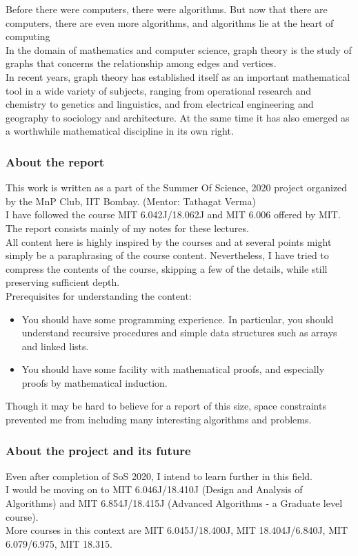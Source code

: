 Before there were computers, there were algorithms. But now that there are computers, there are even more algorithms, and algorithms lie at the heart of computing\\
In the domain of mathematics and computer science, graph theory is the study of graphs that concerns the relationship among edges and vertices.\\
In recent years, graph theory has established itself as an important mathematical tool in a wide variety of subjects, ranging from operational research and chemistry to genetics and linguistics, and from electrical engineering and geography to sociology and architecture. At the same time it has also emerged as a worthwhile mathematical discipline in its own right.

\subsubsection*{About the report}
This work is written as a part of the Summer Of Science, 2020 project organized by the MnP Club, IIT Bombay. (Mentor: Tathagat Verma)\\
I have followed the course MIT 6.042J/18.062J and MIT 6.006 offered by MIT. The report consists mainly of my notes for these lectures.\\
All content here is highly inspired by the courses and at several points might simply be a paraphrasing of the course content. Nevertheless, I have tried to compress the contents of the course, skipping a few of the details, while still preserving sufficient depth.\\
\vspace{3mm}
Prerequisites for understanding the content:\\
\vspace{-3mm}
\begin{itemize}[itemsep = -1 mm]
  \item You should have some programming experience. In particular, you should understand recursive procedures and simple data structures such as arrays and linked lists.
  \item You should have some facility with mathematical proofs, and especially proofs by mathematical induction.
\end{itemize}
Though it may be hard to believe for a report of this size, space constraints prevented me from including many interesting algorithms and problems.

\subsubsection*{About the project and its future}
Even after completion of SoS 2020, I intend to learn further in this field.\\
I would be moving on to MIT 6.046J/18.410J (Design and Analysis of Algorithms) and MIT 6.854J/18.415J (Advanced Algorithms - a Graduate level course).\\
More courses in this context are MIT 6.045J/18.400J, MIT 18.404J/6.840J, MIT 6.079/6.975, MIT 18.315.\\
